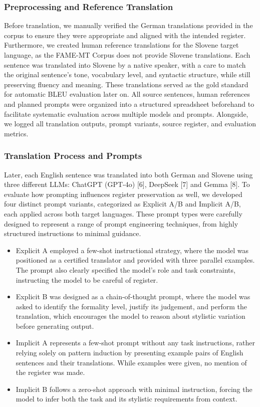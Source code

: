 \documentclass[fleqn,moreauthors,10pt]{ds_report}
\begin{document}
	\subsubsection*{Preprocessing and Reference Translation}
	
Before translation, we manually verified the German translations provided in the corpus to ensure they were appropriate and aligned with the intended register. Furthermore, we created human reference translations for the Slovene target language, as the FAME-MT Corpus does not provide Slovene translations. Each sentence was translated into Slovene by a native speaker, with a care to match the original sentence’s tone, vocabulary level, and syntactic structure, while still preserving fluency and meaning. These translations served as the gold standard for automatic BLEU evaluation later on.
All source sentences, human references and planned prompts were organized into a structured spreadsheet beforehand to facilitate systematic evaluation across multiple models and prompts. Alongside, we logged all translation outputs, prompt variants, source register, and evaluation metrics.

\subsubsection*{Translation Process and Prompts}

Later, each English sentence was translated into both German and Slovene using three different LLMs: ChatGPT (GPT-4o) [6], DeepSeek [7] and Gemma [8]. To evaluate how prompting influences register preservation as well, we developed four distinct prompt variants, categorized as Explicit A/B and Implicit A/B, each applied across both target languages. These prompt types were carefully designed to represent a range of prompt engineering techniques, from highly structured instructions to minimal guidance. 
		
\begin{itemize}
	\item Explicit A employed a few-shot instructional strategy, where the model was positioned as a certified translator and provided with three parallel examples. The prompt also clearly specified the model’s role and task constraints, instructing the model to be careful of register.
	\item Explicit B was designed as a chain-of-thought prompt, where the model was asked to identify the formality level, justify its judgement, and perform the translation, which encourages the model to reason about stylistic variation before generating output.
	\item Implicit A represents a few-shot prompt without any task instructions, rather relying solely on pattern induction by presenting example pairs of English sentences and their translations. While examples were given, no mention of the register was made.
	\item Implicit B follows a zero-shot approach with minimal instruction, forcing the model to infer both the task and its stylistic requirements from context.
\end{itemize}
	
\end{document}
